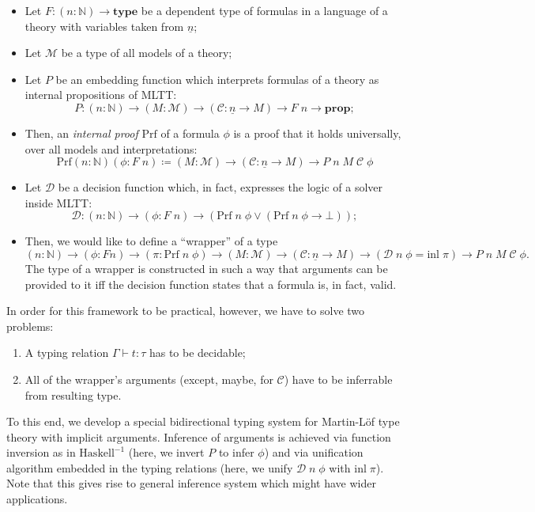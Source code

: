 \documentclass[manuscript,screen,review]{acmart}
\begin{document}
\begin{itemize}
  \item Let $F : (n : \mathbb{N}) \to \mathbf{type}$ be a dependent type of
    formulas in a language of a theory with variables taken from
    $\underline{n}$;
  \item Let $\mathcal{M}$ be a type of all models of a theory;
  \item Let $P$ be an embedding function which interprets formulas of a theory
    as internal propositions of MLTT:
    \[
      P : (n : \mathbb{N}) \to (M : \mathcal{M})
          \to (\mathcal{C} : \underline{n} \to M) \to F\;n \to \mathbf{prop};
    \]
  \item Then, an \textit{internal proof} $\mathrm{Prf}$ of a formula $\phi$ is a
    proof that it holds universally, over all models and interpretations:
    \[
      \mathrm{Prf}(n:\mathbb{N})(\phi:F\;n)\coloneq
      (M:\mathcal{M})\to(\mathcal{C}:\underline{n}\to M)
      \to P\;n\;M\;\mathcal{C}\;\phi
    \]
  \item Let $\mathcal{D}$ be a decision function which, in fact, expresses the
    logic of a solver inside MLTT:
    \[
      \mathcal{D} : (n : \mathbb{N}) \to (\phi : F\;n) \to
      (\mathrm{Prf}\;n\;\phi\lor(\mathrm{Prf}\;n\;\phi\to\bot));
    \]
  \item Then, we would like to define a ``wrapper'' of a type
    \[
      (n : \mathbb{N}) \to (\phi : F n) \to (\pi : \mathrm{Prf} \; n \; \phi)
          \to (M : \mathcal{M}) \to (\mathcal{C} : \underline{n} \to M)
          \to (\mathcal{D} \; n \; \phi = \mathrm{inl} \; \pi)
          \to P \; n \; M \; \mathcal{C} \; \phi.
    \]
    The type of a wrapper is constructed in such a way that arguments can be
    provided to it iff the decision function states that a formula is, in fact,
    valid.
\end{itemize}

In order for this framework to be practical, however, we have to solve two
problems:

\begin{enumerate}
  \item A typing relation $\Gamma \vdash t : \tau$ has to be decidable;
  \item All of the wrapper's arguments (except, maybe, for $\mathcal{C}$)
    have to be inferrable from resulting type.
\end{enumerate}

To this end, we develop a special bidirectional typing system \cite{bidir} for
Martin-L\"of type theory with implicit arguments. Inference of arguments is
achieved via function inversion as in $\mathrm{Haskell}^{-1}$ \cite{haskell}
(here, we invert $P$ to infer $\phi$) and via unification algorithm embedded in
the typing relations (here, we unify $\mathcal{D} \; n \; \phi$ with
$\mathrm{inl} \; \pi$). Note that this gives rise to general inference system
which might have wider applications.



\end{document}
